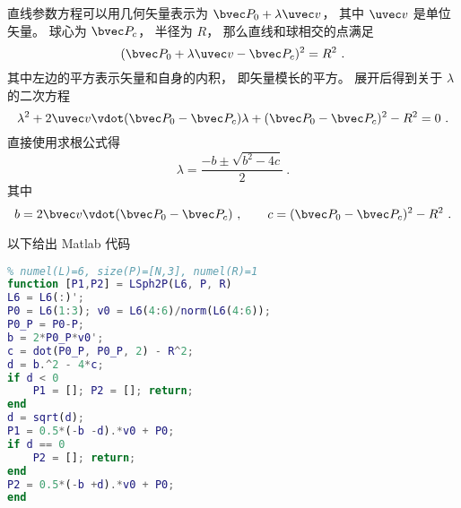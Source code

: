 

直线参数方程可以用几何矢量表示为 $\bvec P_0 + \lambda \uvec v$， 其中 $\uvec v$ 是单位矢量。 球心为 $\bvec P_c$， 半径为 $R$， 那么直线和球相交的点满足
\begin{equation}
(\bvec P_0 + \lambda \uvec v - \bvec P_c)^2 = R^2~.
\end{equation}
其中左边的平方表示矢量和自身的内积， 即矢量模长的平方。 展开后得到关于 $\lambda$ 的二次方程
\begin{equation}
\lambda^2 + 2\uvec v \vdot (\bvec P_0 - \bvec P_c) \lambda + (\bvec P_0 - \bvec P_c)^2 - R^2 = 0~.
\end{equation}
直接使用求根公式得
\begin{equation}
\lambda = \frac{-b \pm \sqrt{b^2 - 4c}}{2}~.
\end{equation}
其中
\begin{equation}
b = 2\bvec v \vdot (\bvec P_0 - \bvec P_c)~,
\qquad
c = (\bvec P_0 - \bvec P_c)^2 - R^2~.
\end{equation}

以下给出 Matlab 代码
\begin{lstlisting}[language=matlab, caption=LSph2P.m]
% 计算直线和球的焦点
% numel(L)=6, size(P)=[N,3], numel(R)=1
function [P1,P2] = LSph2P(L6, P, R)
L6 = L6(:)';
P0 = L6(1:3); v0 = L6(4:6)/norm(L6(4:6));
P0_P = P0-P;
b = 2*P0_P*v0';
c = dot(P0_P, P0_P, 2) - R^2;
d = b.^2 - 4*c;
if d < 0
    P1 = []; P2 = []; return;
end
d = sqrt(d);
P1 = 0.5*(-b -d).*v0 + P0;
if d == 0
    P2 = []; return;
end
P2 = 0.5*(-b +d).*v0 + P0;
end
\end{lstlisting}
